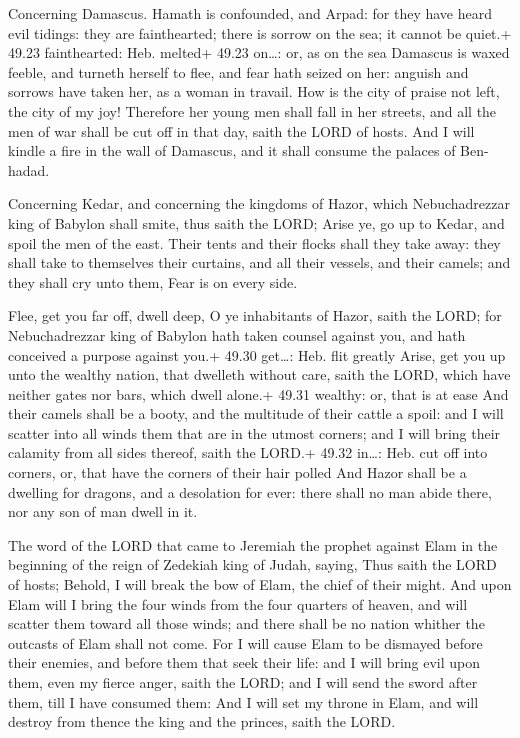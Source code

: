  Concerning Damascus. Hamath is confounded, and Arpad:
for they have heard evil tidings: they are fainthearted; there is sorrow
on the sea; it cannot be quiet.+ 49.23 fainthearted: Heb. melted+ 49.23
on\ldots: or, as on the sea  Damascus is waxed feeble, and
turneth herself to flee, and fear hath seized on her: anguish and
sorrows have taken her, as a woman in travail.  How is the
city of praise not left, the city of my joy!  Therefore her
young men shall fall in her streets, and all the men of war shall be cut
off in that day, saith the LORD of hosts.  And I will
kindle a fire in the wall of Damascus, and it shall consume the palaces
of Ben-hadad.

 Concerning Kedar, and concerning the kingdoms of Hazor,
which Nebuchadrezzar king of Babylon shall smite, thus saith the LORD;
Arise ye, go up to Kedar, and spoil the men of the east. 
Their tents and their flocks shall they take away: they shall take to
themselves their curtains, and all their vessels, and their camels; and
they shall cry unto them, Fear is on every side.

 Flee, get you far off, dwell deep, O ye inhabitants of
Hazor, saith the LORD; for Nebuchadrezzar king of Babylon hath taken
counsel against you, and hath conceived a purpose against you.+ 49.30
get\ldots: Heb. flit greatly  Arise, get you up unto the
wealthy nation, that dwelleth without care, saith the LORD, which have
neither gates nor bars, which dwell alone.+ 49.31 wealthy: or, that is
at ease  And their camels shall be a booty, and the
multitude of their cattle a spoil: and I will scatter into all winds
them that are in the utmost corners; and I will bring their calamity
from all sides thereof, saith the LORD.+ 49.32 in\ldots: Heb. cut off
into corners, or, that have the corners of their hair polled
 And Hazor shall be a dwelling for dragons, and a
desolation for ever: there shall no man abide there, nor any son of man
dwell in it.

 The word of the LORD that came to Jeremiah the prophet
against Elam in the beginning of the reign of Zedekiah king of Judah,
saying,  Thus saith the LORD of hosts; Behold, I will break
the bow of Elam, the chief of their might.  And upon Elam
will I bring the four winds from the four quarters of heaven, and will
scatter them toward all those winds; and there shall be no nation
whither the outcasts of Elam shall not come.  For I will
cause Elam to be dismayed before their enemies, and before them that
seek their life: and I will bring evil upon them, even my fierce anger,
saith the LORD; and I will send the sword after them, till I have
consumed them:  And I will set my throne in Elam, and will
destroy from thence the king and the princes, saith the LORD.

